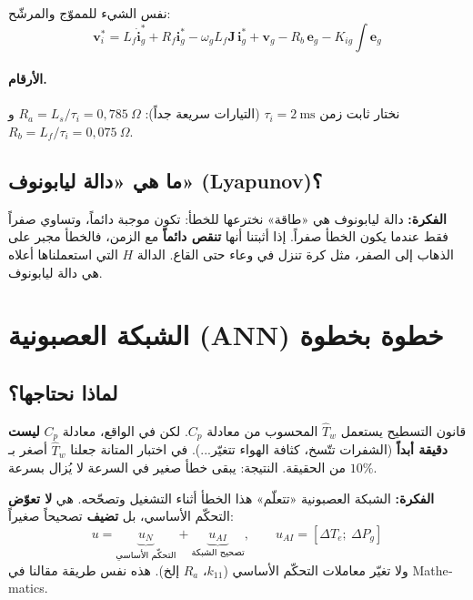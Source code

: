 \documentclass[11pt,a4paper]{article}
\newcommand{\fr}[1]{\textfrench{#1}}
\newcommand{\bv}[1]{\boldsymbol{#1}}
\newcommand{\Fikra}{\textbf{الفكرة: }}
\begin{document}
نفس الشيء للمموّج والمرشّح:
\begin{equation}
\boxed{\bv{v}_i^* = L_f\dot{\bv{i}}_g^* + R_f\bv{i}_g^* - \omega_g L_f\mathbf{J}\,\bv{i}_g^* + \bv{v}_g - R_b\,\bv{e}_g - K_{ig}\!\int\!\bv{e}_g}
\end{equation}

\paragraph{الأرقام.} نختار ثابت زمن $\tau_i = 2\ \mathrm{ms}$ (التيارات سريعة جداً):
$R_a = L_s/\tau_i = 0{,}785\ \Omega$ و $R_b = L_f/\tau_i = 0{,}075\ \Omega$.

\subsection{ما هي «دالة ليابونوف» (\fr{Lyapunov})؟}
\begin{fikra}
\Fikra
دالة ليابونوف هي «طاقة» نخترعها للخطأ: تكون موجبة دائماً، وتساوي صفراً فقط عندما يكون الخطأ صفراً.
إذا أثبتنا أنها \textbf{تنقص دائماً} مع الزمن، فالخطأ مجبر على الذهاب إلى الصفر، مثل كرة تنزل في
وعاء حتى القاع. الدالة $H$ التي استعملناها أعلاه هي دالة ليابونوف.
\end{fikra}

\section{الشبكة العصبونية (\fr{ANN}) خطوة بخطوة}

\subsection{لماذا نحتاجها؟}
قانون التسطيح يستعمل $\hat T_w$ المحسوب من معادلة $C_p$. لكن في الواقع، معادلة $C_p$ \textbf{ليست دقيقة
أبداً} (الشفرات تتّسخ، كثافة الهواء تتغيّر...). في اختبار المتانة جعلنا $\hat T_w$ أصغر بـ $10\%$ من
الحقيقة. النتيجة: يبقى خطأ صغير في السرعة لا يُزال بسرعة.
\begin{fikra}
\Fikra
الشبكة العصبونية «تتعلّم» هذا الخطأ أثناء التشغيل وتصحّحه. هي \textbf{لا تعوّض} التحكّم الأساسي،
بل \textbf{تضيف} تصحيحاً صغيراً:
\[
u = \underbrace{u_N}_{\text{التحكّم الأساسي}} + \underbrace{u_{AI}}_{\text{تصحيح الشبكة}},
\qquad u_{AI} = [\Delta T_e;\ \Delta P_g]
\]
ولا تغيّر معاملات التحكّم الأساسي ($k_{11}$، $R_a$ إلخ). هذه نفس طريقة مقالنا في \fr{Mathematics}.
\end{fikra}
\end{document}
